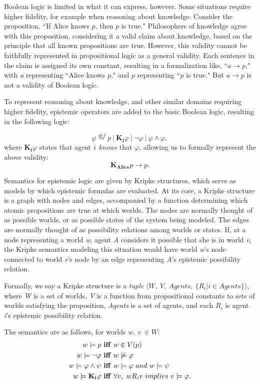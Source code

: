 Boolean logic is limited in what it can express, however. Some situations require higher fidelity, for example when reasoning about knowledge. Consider the proposition, ``If Alice knows $p$, then $p$ is true." Philosophers of knowledge agree with this proposition, considering it a valid claim about knowledge, based on the principle that all known propositions are true. However, this validity cannot be faithfully represented in propositional logic as a general validity. Each sentence in the claim is assigned its own constant, resulting in a formalization like, ``$\mathit{a} \rightarrow \mathit{p}$," with {\emph a} representing ``Alice knows $p$," and $p$ representing ``$p$ is true." But $\mathit{a} \rightarrow \mathit{p}$ is not a validity of Boolean logic. 

To represent reasoning about knowledge, and other similar domains requiring higher fidelity, epistemic operators are added to the basic Boolean logic, resulting in the following logic:

$$\varphi \stackrel{def}{=} p\  |\ \mathbf{K_{i}}\varphi\ |\ \neg \varphi\ |\ \varphi \wedge \varphi, 
$$
where $\mathbf{K_{i}}\varphi$ states that agent ${\boldmath i}$ \emph{knows} that \emph{$\varphi$}, allowing us to formally represent the above validity:
$$\mathbf{K_{Alice}}p \rightarrow p.$$

Semantics for epistemic logic are given by Kripke structures, which serve as models by which epistemic formulas are evaluated. At its core, a Kripke structure is a graph with nodes and edges, accompanied by a function determining which atomic propositions are true at which worlds. The nodes are normally thought of as possible worlds, or as possible states of the system being modeled. The edges are normally thought of as possibility relations among worlds or states. If, at a node representing a world {\emph w}, agent {\emph A} considers it possible that she is in world {\emph v}, the Kripke semantics modeling this situation would have world {\emph w}'s node connected to world {\emph v}'s node by an edge representing {\emph A}'s epistemic possibility relation.

Formally, we say a Kripke structure is a \emph{tuple} $\langle W,\ V,\ Agents,\ \{R_{i}|i\in Agents\}\rangle,$ where \emph{W} is a set of worlds, \emph{V} is a function from propositional constants to sets of worlds satisfying the proposition, \emph{Agents} is a set of agents, and each $R_{i}$ is agent \emph{i}'s epistemic possibility relation.

The semantics are as follows, for worlds $w,\ v\ \in W$:
\begin{align*}
w \models p\  &\mathbf{iff}\ w \in V(p) \\
w \models \neg \varphi\  &\mathbf{iff}\  w\not\models \varphi  \\
w \models \varphi \wedge \psi\ &\mathbf{iff}\ w\models \varphi\ \mathnormal{and}\ w\models \psi \\
w \models \mathbf{K_{i}}\varphi\  &\mathbf{iff}\ \forall v,\ wR_{i}v\  \mathnormal{implies}\ v \models \varphi.
\end{align*}

